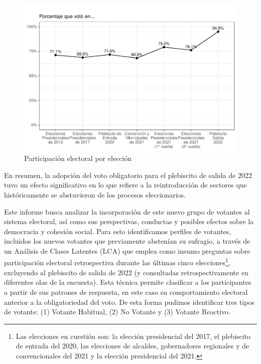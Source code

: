 \documentclass[
  12pt,
]{book}
\begin{document}
\begin{figure}

{\centering \includegraphics{reporte-elsoc_files/figure-latex/graf-participacion-1} 

}

\caption{Participación electoral por elección}\label{fig:graf-participacion}
\end{figure}

En resumen, la adopción del voto obligatorio para el plebiscito de salida de 2022 tuvo un efecto significativo en lo que refiere a la reintroducción de sectores que históricamente se abstuvieron de los procesos eleccionarios.

Este informe busca analizar la incorporación de este nuevo grupo de votantes al sistema electoral, así como sus perspectivas, conductas y posibles efectos sobre la democracia y cohesión social. Para esto identificamos perfiles de votantes, incluidos los nuevos votantes que previamente abstenían su sufragio, a través de un Análisis de Clases Latentes (LCA) que emplea como insumo preguntas sobre participación electoral retrospectiva durante las últimas cinco elecciones\footnote{Las elecciones en cuestión son: la elección presidencial del 2017, el plebiscito de entrada del 2020, las elecciones de alcaldes, gobernadores regionales y de convencionales del 2021 y la elección presidencial del 2021.}, excluyendo al plebiscito de salida de 2022 (y consultadas retrospectivamente en diferentes olas de la encuesta). Esta técnica permite clasificar a los participantes a partir de sus patrones de respuesta, en este caso su comportamiento electoral anterior a la obligatoriedad del voto. De esta forma pudimos identificar tres tipos de votante: (1) Votante Habitual, (2) No Votante y (3) Votante Reactivo.
\end{document}
